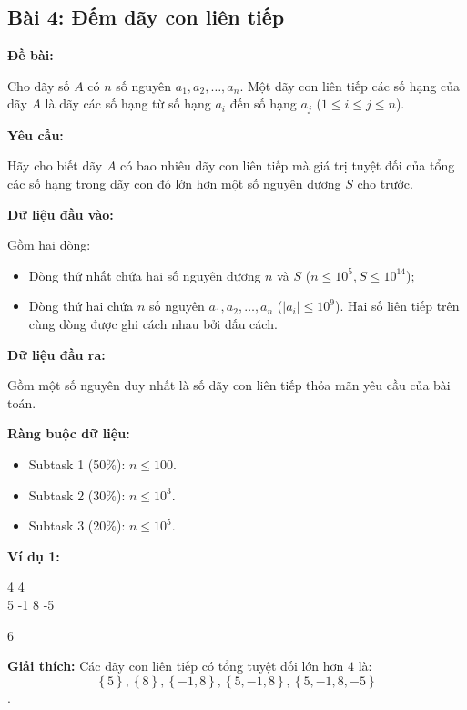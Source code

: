 \documentclass[12pt]{scrartcl}  %
\begin{document}
\subsection{Bài 4: Đếm dãy con liên tiếp}
\textbf{Đề bài:}

Cho dãy số $A$ có $n$ số nguyên $a_1, a_2, \ldots, a_n$. Một dãy con liên tiếp các số hạng của dãy $A$ là dãy các số hạng từ số hạng $a_i$ đến số hạng $a_j$ ($1 \leq i \leq j \leq n$).

\textbf{Yêu cầu:}

Hãy cho biết dãy $A$ có bao nhiêu dãy con liên tiếp mà giá trị tuyệt đối của tổng các số hạng trong dãy con đó lớn hơn một số nguyên dương $S$ cho trước.

\textbf{Dữ liệu đầu vào:}

Gồm hai dòng:
\begin{itemize}
    \item Dòng thứ nhất chứa hai số nguyên dương $n$ và $S$ ($n \leq 10^5, S \leq 10^{14}$);
    \item Dòng thứ hai chứa $n$ số nguyên $a_1, a_2, \ldots, a_n$ ($|a_i| \leq 10^9$). Hai số liên tiếp trên cùng dòng được ghi cách nhau bởi dấu cách.
\end{itemize}

\textbf{Dữ liệu đầu ra:}

Gồm một số nguyên duy nhất là số dãy con liên tiếp thỏa mãn yêu cầu của bài toán.

\textbf{Ràng buộc dữ liệu:}
\begin{itemize}
    \item Subtask 1 (50\%): $n \leq 100$.
    \item Subtask 2 (30\%): $n \leq 10^3$.
    \item Subtask 3 (20\%): $n \leq 10^5$.
\end{itemize}

\textbf{Ví dụ 1:}
\begin{tcolorbox}[colback=gray!5!white, colframe=blue!50!black, title=Input]
4 4\\
5 -1 8 -5
\end{tcolorbox}
\begin{tcolorbox}[colback=gray!5!white, colframe=green!50!black, title=Output]
6
\end{tcolorbox}

\textbf{Giải thích:}
Các dãy con liên tiếp có tổng tuyệt đối lớn hơn $4$ là: $$\left\{5 \right\}, \left\{ 8 \right\}, \left\{ -1, 8 \right\}, \left\{ 5, -1, 8 \right\}, \left\{ 5, -1, 8, -5 \right\}$$.
\end{document}
